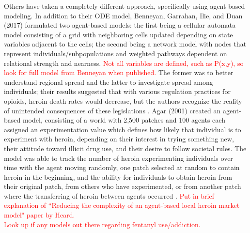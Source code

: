 \documentclass[12pt]{article}
\begin{document}
Others have taken a completely different approach, specifically using agent-based modeling. In addition to their ODE model, Benneyan, Garrahan, Ilie, and Duan (2017) formulated two agent-based models: the first being a cellular automata model consisting of a grid with neighboring cells updated depending on state variables adjacent to the cells; the second being a network model with nodes that represent individuals/subpopulations and weighted pathways dependent on relational strength and nearness. \textcolor{red}{Not all variables are defined, such as P(x,y), so look for full model from Benneyan when published.} The former was to better understand regional spread and the latter to investigate spread among individuals; their results suggested that with various regulation practices for opioids, heroin death rates would decrease, but the authors recognize the reality of unintended consequences of these legislations \cite{Benneyan}. Agar (2001) created an agent-based model, consisting of a world with 2,500 patches and 100 agents each assigned an experimentation value which defines how likely that individual is to experiment with heroin, depending on their interest in trying something new, their attitude toward illicit drug use, and their desire to follow societal rules. The model was able to track the number of heroin experimenting individuals over time with the agent moving randomly, one patch selected at random to contain heroin in the beginning, and the ability for individuals to obtain heroin from their original patch, from others who have experimented, or from another patch where the transferring of heroin between agents occurred \cite{Agar}. \textcolor{red}{Put in brief explanation of ``Reducing the complexity of an agent-based local heroin market model" paper by Heard. \\ Look up if any models out there regarding fentanyl use/addiction.} \\
\end{document}
